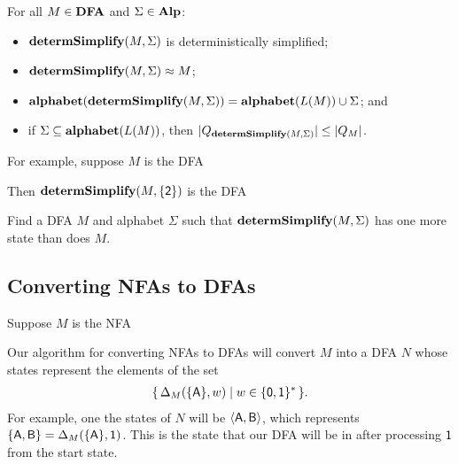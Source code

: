 \begin{theorem}
For all $M\in\mathbf{DFA}$ and $\Sigma\in\mathbf{Alp}$:
\begin{itemize}
\item $\mathbf{determSimplify}(M,\Sigma)$ is deterministically simplified;

\item $\mathbf{determSimplify}(M,\Sigma)\approx M$;

\item $\mathbf{alphabet}(\mathbf{determSimplify}(M,\Sigma)) = \mathbf{alphabet}(L(M))\cup\Sigma$; and

\item if $\Sigma\subseteq\mathbf{alphabet}(L(M))$, then 
  $|Q_{\mathbf{determSimplify}(M, \Sigma)}| \leq |Q_M|$.
\end{itemize}
\end{theorem}

For example, suppose $M$ is the DFA
\begin{center}

\end{center}
Then $\mathbf{determSimplify}(M,\{\mathsf{2}\})$ is the DFA
\begin{center}

\end{center}

\begin{exercise}
Find a DFA $M$ and alphabet $\Sigma$ such that
$\mathbf{determSimplify}(M,\Sigma)$ has one more state than does $M$.
\end{exercise}

\subsection{Converting NFAs to DFAs}

%
%
Suppose $M$ is the NFA
\begin{center}

\end{center}
Our algorithm for converting NFAs to DFAs will convert $M$ into a DFA
$N$ whose states represent the elements of the set
\begin{gather*}
\{ \, \Delta_M(\{\mathsf{A}\},w) \mid w\in\{\mathsf{0},\mathsf{1}\}^* \, \} .
\end{gather*}
For example, one the states of $N$ will be $\langle\mathsf{A},\mathsf{B}\rangle$,
which represents $\{\mathsf{A},\mathsf{B}\}=\Delta_M(\{\mathsf{A}\},\mathsf{1})$.
This is the state that our DFA will be in after processing $\mathsf{1}$
from the start state.

